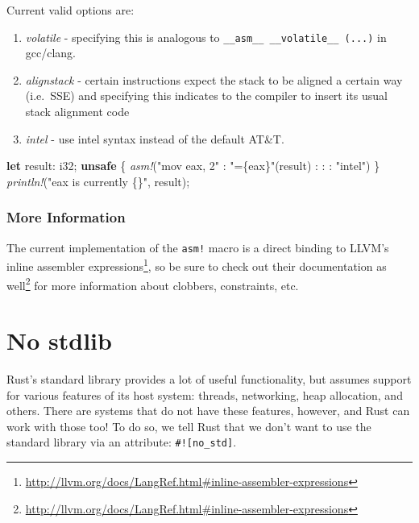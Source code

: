 \documentclass[a4paper,]{book}
\renewcommand*{\hypertarget}[3][\ar]{%
  \def\ar{#2}%
  \label{#1}%
  #3}
\newenvironment{Shaded}{\begin{snugshade}}{\end{snugshade}}
\newcommand{\KeywordTok}[1]{\textcolor[rgb]{0.13,0.29,0.53}{\textbf{{#1}}}}
\newcommand{\DataTypeTok}[1]{\textcolor[rgb]{0.13,0.29,0.53}{{#1}}}
\newcommand{\StringTok}[1]{\textcolor[rgb]{0.31,0.60,0.02}{{#1}}}
\newcommand{\PreprocessorTok}[1]{\textcolor[rgb]{0.56,0.35,0.01}{\textit{{#1}}}}
\newcommand{\NormalTok}[1]{{#1}}
\renewcommand{\href}[2]{#2\footnote{\url{#1}}}
\providecommand{\tightlist}{%
  \setlength{\itemsep}{0pt}\setlength{\parskip}{0pt}}
\begin{document}
Current valid options are:

\begin{enumerate}
\def\labelenumi{\arabic{enumi}.}
\tightlist
\item
  \emph{volatile} - specifying this is analogous to
  \texttt{\_\_asm\_\_\ \_\_volatile\_\_\ (...)} in gcc/clang.
\item
  \emph{alignstack} - certain instructions expect the stack to be
  aligned a certain way (i.e.~SSE) and specifying this indicates to the
  compiler to insert its usual stack alignment code
\item
  \emph{intel} - use intel syntax instead of the default AT\&T.
\end{enumerate}

\begin{Shaded}
\begin{Highlighting}[]
\KeywordTok{let} \NormalTok{result: }\DataTypeTok{i32}\NormalTok{;}
\KeywordTok{unsafe} \NormalTok{\{}
   \PreprocessorTok{asm!}\NormalTok{(}\StringTok{"mov eax, 2"} \NormalTok{: }\StringTok{"=\{eax\}"}\NormalTok{(result) : : : }\StringTok{"intel"}\NormalTok{)}
\NormalTok{\}}
\PreprocessorTok{println!}\NormalTok{(}\StringTok{"eax is currently \{\}"}\NormalTok{, result);}
\end{Highlighting}
\end{Shaded}

\subsubsection{More Information}\label{more-information}

The current implementation of the \texttt{asm!} macro is a direct
binding to
\href{http://llvm.org/docs/LangRef.html\#inline-assembler-expressions}{LLVM's
inline assembler expressions}, so be sure to check out
\href{http://llvm.org/docs/LangRef.html\#inline-assembler-expressions}{their
documentation as well} for more information about clobbers, constraints,
etc.

\hypertarget{sec--no-stdlib}{\section{No stdlib}\label{sec--no-stdlib}}

Rust's standard library provides a lot of useful functionality, but
assumes support for various features of its host system: threads,
networking, heap allocation, and others. There are systems that do not
have these features, however, and Rust can work with those too! To do
so, we tell Rust that we don't want to use the standard library via an
attribute: \texttt{\#!{[}no\_std{]}}.
\end{document}

